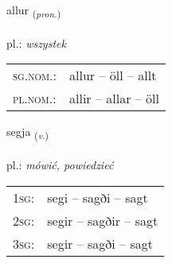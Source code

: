 \documentclass[frontgrid, backgrid]{flacards}\usepackage[]{graphicx}\usepackage[]{xcolor}
\begin{document}
\renewcommand{\blhead}{\vskip5pt {\small\bfseries\footnotesize Fornafn | zaimek }}
\renewcommand{\bcfoot}{\vskip5pt \hspace{2pt}{\small\bfseries\footnotesize 1K}}


{allur \small{\textsubscript{(\textit{pron.})}} \\[1ex] %
\textphonetic{[atlʏr]} \\
pl.: \emph{wszystek} \\  [2ex]
\renewcommand*{\arraystretch}{0.8}
\begin{tabular}{ll}
\textsc{sg.nom.}: & allur  --  öll -- allt \\ 
\textsc{pl.nom.}: & allir -- allar -- öll
\end{tabular}
}

\renewcommand{\flhead}{\vskip5pt \fboxsep=0pt {\small\bfseries\footnotesize Sagnorð | czasownik}}
\renewcommand{\fcfoot}{\vskip5pt \fboxsep=0pt \hspace{2pt}{\small\bfseries\footnotesize 1K}}

\renewcommand{\blhead}{\vskip5pt {\small\bfseries\footnotesize Sagnorð | czasownik }}
\renewcommand{\bcfoot}{\vskip5pt \hspace{2pt}{\small\bfseries\footnotesize 1K}}


{segja \small{\textsubscript{(\textit{v.})}} \\[1ex] %
\textphonetic{[seija]} \\
pl.: \emph{mówić, powiedzieć} \\  [2ex]
\renewcommand*{\arraystretch}{0.8}
\begin{tabular}{p{1cm}l}
\textsc{1sg}: & segi -- sagði -- sagt \\ 
\textsc{2sg}: & segir -- sagðir -- sagt \\ 
\textsc{3sg}: & segir -- sagði -- sagt \\ 
\end{tabular}
}

\renewcommand{\flhead}{\vskip5pt \fboxsep=0pt {\small\bfseries\footnotesize Fornafn | zaimek}}
\renewcommand{\fcfoot}{\vskip5pt \fboxsep=0pt \hspace{2pt}{\small\bfseries\footnotesize 1K}}
\end{document}
